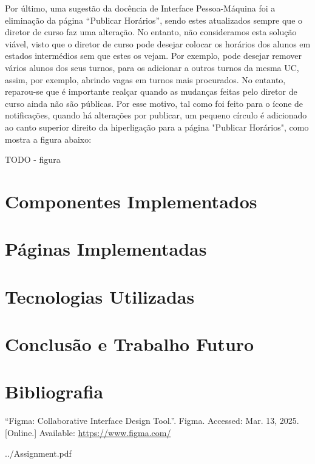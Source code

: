 \documentclass[12pt, a4paper]{article}
\begin{document}
Por último, uma sugestão da docência de Interface Pessoa-Máquina foi a eliminação da página
``Publicar Horários'', sendo estes atualizados sempre que o diretor de curso faz uma alteração. No
entanto, não consideramos esta solução viável, visto que o diretor de curso pode desejar colocar os
horários dos alunos em estados intermédios sem que estes os vejam. Por exemplo, pode desejar remover
vários alunos dos seus turnos, para os adicionar a outros turnos da mesma UC, assim, por exemplo,
abrindo vagas em turnos mais procurados. No entanto, reparou-se que é importante realçar quando as
mudanças feitas pelo diretor de curso ainda não são públicas. Por esse motivo, tal como foi feito
para o ícone de notificações, quando há alterações por publicar, um pequeno círculo é adicionado ao
canto superior direito da hiperligação para a página "Publicar Horários", como mostra a figura
abaixo:

{\color{red} TODO - figura}

\section{Componentes Implementados}

\section{Páginas Implementadas}

\section{Tecnologias Utilizadas}

\section{Conclusão e Trabalho Futuro}

\begingroup
\section{Bibliografia}
\renewcommand{\section}[2]{}

\begin{thebibliography}{9}
        ``Figma: Collaborative Interface Design Tool.''. Figma. Accessed: Mar. 13, 2025. [Online.]
        Available: \url{https://www.figma.com/}
\end{thebibliography}
\endgroup


    {../Assignment.pdf}

\end{document}

